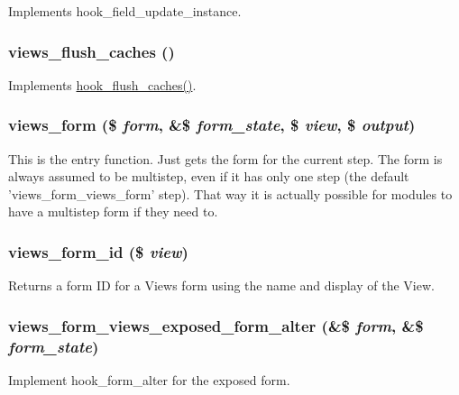 \label{views_8module_aad19a47ddacc5b8344e42a6ff92b7c4f}
Implements hook\_\-field\_\-update\_\-instance. \hypertarget{views_8module_acb54c1ed22df1323d1191cc3ff0c6891}{
\subsubsection[{views\_\-flush\_\-caches}]{\setlength{\rightskip}{0pt plus 5cm}views\_\-flush\_\-caches ()}}
\label{views_8module_acb54c1ed22df1323d1191cc3ff0c6891}
Implements \hyperlink{group__hooks_ga66531e6e564157b7ca45ed07549c9b97}{hook\_\-flush\_\-caches()}. \hypertarget{views_8module_ad2b3623cab717e77713170df21927c92}{
\subsubsection[{views\_\-form}]{\setlength{\rightskip}{0pt plus 5cm}views\_\-form (\$ {\em form}, \/  \&\$ {\em form\_\-state}, \/  \$ {\em view}, \/  \$ {\em output})}}
\label{views_8module_ad2b3623cab717e77713170df21927c92}
This is the entry function. Just gets the form for the current step. The form is always assumed to be multistep, even if it has only one step (the default 'views\_\-form\_\-views\_\-form' step). That way it is actually possible for modules to have a multistep form if they need to. \hypertarget{views_8module_abd283e66b3b172682b7a1fe2b59fbca9}{
\subsubsection[{views\_\-form\_\-id}]{\setlength{\rightskip}{0pt plus 5cm}views\_\-form\_\-id (\$ {\em view})}}
\label{views_8module_abd283e66b3b172682b7a1fe2b59fbca9}
Returns a form ID for a Views form using the name and display of the View. \hypertarget{views_8module_a1b2f933056d6e97e743b462d39e1d535}{
\subsubsection[{views\_\-form\_\-views\_\-exposed\_\-form\_\-alter}]{\setlength{\rightskip}{0pt plus 5cm}views\_\-form\_\-views\_\-exposed\_\-form\_\-alter (\&\$ {\em form}, \/  \&\$ {\em form\_\-state})}}
\label{views_8module_a1b2f933056d6e97e743b462d39e1d535}
Implement hook\_\-form\_\-alter for the exposed form.

